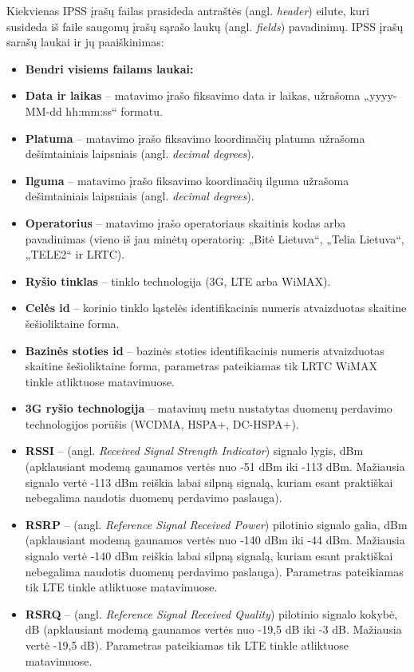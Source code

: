 \documentclass{VUMIFPSbakalaurinis}
\begin{document}
Kiekvienas IPSS įrašų failas prasideda antraštės (angl. \textit{header}) eilute, kuri susideda iš faile saugomų įrašų sąrašo laukų (angl. \textit{fields}) pavadinimų. IPSS įrašų sarašų laukai ir jų paaiškinimas:

\begin{itemize}
	\item \textbf{Bendri visiems failams laukai:}
	\item \textbf{Data ir laikas} – matavimo įrašo fiksavimo data ir laikas, užrašoma „yyyy-MM-dd hh:mm:ss“ formatu.
	\item \textbf{Platuma} – matavimo įrašo fiksavimo koordinačių platuma užrašoma dešimtainiais laipsniais (angl. \textit{decimal degrees}).
	\item \textbf{Ilguma} – matavimo įrašo fiksavimo koordinačių ilguma užrašoma dešimtainiais laipsniais (angl. \textit{decimal degrees}).
	\item \textbf{Operatorius} – matavimo įrašo operatoriaus skaitinis kodas arba pavadinimas (vieno iš jau minėtų operatorių: „Bitė Lietuva“, „Telia Lietuva“, „TELE2“ ir LRTC).
	\item \textbf{Ryšio tinklas} – tinklo technologija (3G, LTE arba WiMAX).
	\item \textbf{Celės id} – korinio tinklo ląstelės identifikacinis numeris atvaizduotas skaitine šešioliktaine forma.
	\item \textbf{Bazinės stoties id} – bazinės stoties identifikacinis numeris atvaizduotas skaitine šešioliktaine forma, parametras pateikiamas tik LRTC WiMAX tinkle atliktuose matavimuose.
	\item \textbf{3G ryšio technologija} – matavimų metu nustatytas duomenų perdavimo technologijos porūšis (WCDMA, HSPA+, DC-HSPA+).
	\item \textbf{RSSI} – (angl. \textit{Received Signal Strength Indicator}) signalo lygis, dBm (apklausiant modemą gaunamos vertės nuo -51 dBm iki -113 dBm. Mažiausia signalo vertė -113 dBm reiškia labai silpną signalą, kuriam esant praktiškai nebegalima naudotis duomenų perdavimo paslauga).
	\item \textbf{RSRP} – (angl. \textit{Reference Signal Received Power}) pilotinio signalo galia, dBm (apklausiant modemą gaunamos vertės nuo -140 dBm iki -44 dBm. Mažiausia signalo vertė -140 dBm reiškia labai silpną signalą, kuriam esant praktiškai nebegalima naudotis duomenų perdavimo paslauga). Parametras pateikiamas tik LTE tinkle atliktuose matavimuose.
	\item \textbf{RSRQ} – (angl. \textit{Reference Signal Received Quality}) pilotinio signalo kokybė, dB (apklausiant modemą gaunamos vertės nuo -19,5 dB iki -3 dB. Mažiausia vertė -19,5 dB). Parametras pateikiamas tik LTE tinkle atliktuose matavimuose.

\end{itemize}
\end{document}
